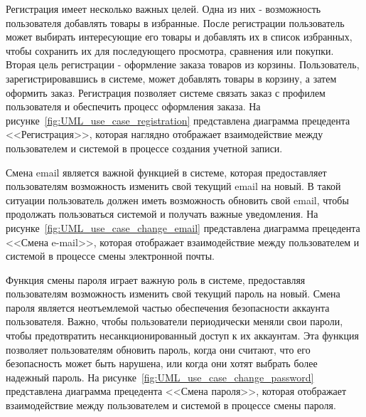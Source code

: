 
Регистрация имеет несколько важных целей. Одна из них - возможность пользователя добавлять товары в избранные.
После регистрации пользователь может выбирать интересующие его товары и добавлять их в список избранных,
чтобы сохранить их для последующего просмотра, сравнения или покупки.
Вторая цель регистрации - оформление заказа товаров из корзины.
Пользователь, зарегистрировавшись в системе, может добавлять товары в корзину,
а затем оформить заказ.
Регистрация позволяет системе связать заказ с профилем пользователя
и обеспечить процесс оформления заказа.
На рисунке~\ref{fig:UML_use_case_registration} представлена диаграмма прецедента <<Регистрация>>,
которая наглядно отображает взаимодействие между пользователем и системой в процессе создания учетной записи.





Смена email является важной функцией в системе,
которая предоставляет пользователям возможность изменить свой текущий email на новый.
В такой ситуации пользователь должен иметь возможность обновить свой email,
чтобы продолжать пользоваться системой и получать важные уведомления.
На рисунке~\ref{fig:UML_use_case_change_email} представлена диаграмма прецедента <<Смена e-mail>>,
которая отображает взаимодействие между пользователем и системой в процессе смены электронной почты.





Функция смены пароля играет важную роль в системе,
предоставляя пользователям возможность изменить свой текущий пароль на новый.
Смена пароля является неотъемлемой частью обеспечения безопасности аккаунта пользователя.
Важно, чтобы пользователи периодически меняли свои пароли,
чтобы предотвратить несанкционированный доступ к их аккаунтам.
Эта функция позволяет пользователям обновить пароль, когда они считают,
что его безопасность может быть нарушена, или когда они хотят выбрать более надежный пароль.
На рисунке~\ref{fig:UML_use_case_change_password} представлена диаграмма прецедента <<Смена пароля>>,
которая отображает взаимодействие между пользователем и системой в процессе
смены пароля.

